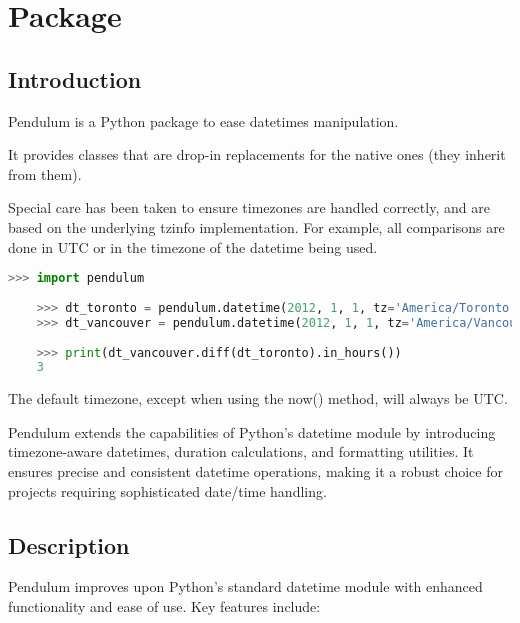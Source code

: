%
%
%


\chapter{Package }


\section{Introduction}


Pendulum is a Python package to ease datetimes manipulation.

It provides classes that are drop-in replacements for the native ones (they inherit from them).

Special care has been taken to ensure timezones are handled correctly, and are based on the underlying tzinfo implementation. For example, all comparisons are done in UTC or in the timezone of the datetime being used.

\begin{lstlisting}[language=python, caption={Calculating Time Difference Between Toronto and Vancouver}, label={lst:pendulum}, style=pythonstyle ]
	>>> import pendulum
	
	>>> dt_toronto = pendulum.datetime(2012, 1, 1, tz='America/Toronto')
	>>> dt_vancouver = pendulum.datetime(2012, 1, 1, tz='America/Vancouver')
	
	>>> print(dt_vancouver.diff(dt_toronto).in_hours())
	3
\end{lstlisting}

The default timezone, except when using the now() method, will always be UTC.

Pendulum extends the capabilities of Python’s datetime module by introducing timezone-aware datetimes, duration calculations, and formatting utilities. It ensures precise and consistent datetime operations, making it a robust choice for projects requiring sophisticated date/time handling.


\section{Description}

Pendulum improves upon Python’s standard datetime module with enhanced functionality and ease of use. Key features include:

